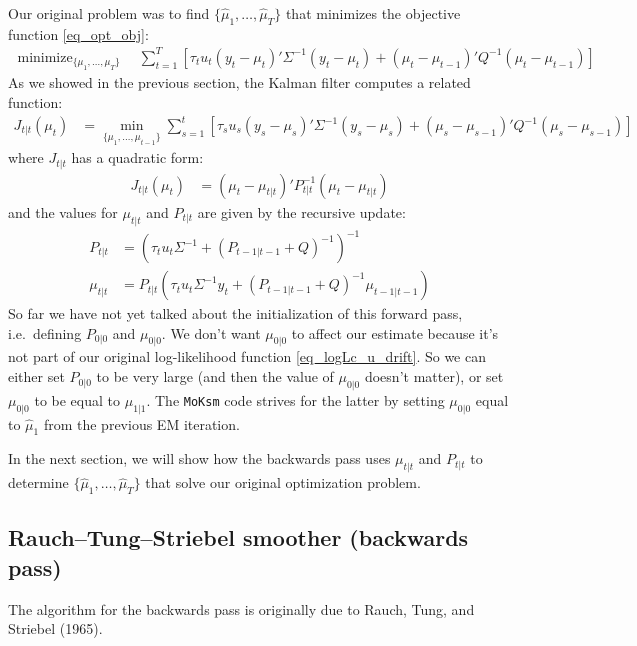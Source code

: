 \documentclass[11pt]{article}
\DeclareMathOperator*{\minimize}{minimize}
\begin{document}
Our original problem was to find $\{ \hat\mu_1, \dotsc, \hat\mu_T\}$ that minimizes the objective function \eqref{eq_opt_obj}:
\begin{align*}
	\minimize_{\{\mu_1, \dotsc, \mu_T\}} \quad 
	\sum_{t=1}^T \left[ \tau_{t} u_{t} (y_t - \mu_{t})' \Sigma^{-1} (y_t-\mu_{t}) 
	+ (\mu_{t} - \mu_{t-1})' Q^{-1} (\mu_{t} - \mu_{t-1}) \right]
\end{align*}
As we showed in the previous section, the Kalman filter computes a related function:
\begin{align*}
	J_{t|t}( \mu_t ) &= \min_{\{\mu_1, \dotsc, \mu_{t-1}\}} \sum_{s=1}^t \left[ 
	\tau_s u_s (y_s - \mu_s)' \Sigma^{-1} (y_s - \mu_s) + (\mu_s - \mu_{s-1})' Q^{-1} (\mu_s - \mu_{s-1})
	\right]
\end{align*}
where $J_{t|t}$ has a quadratic form:
\begin{align*}
	J_{t|t}(\mu_t) &= (\mu_t - \mu_{t|t})' P_{t|t}^{-1} (\mu_t - \mu_{t|t})
\end{align*}
and the values for $\mu_{t|t}$ and $P_{t|t}$ are given by the recursive update:
\begin{align}
	P_{t|t} &= \left(\tau_t u_t \Sigma^{-1} + (P_{t-1|t-1} + Q)^{-1}\right)^{-1} \\
	\mu_{t|t} &= P_{t|t} \left(\tau_t u_t \Sigma^{-1} y_t + (P_{t-1|t-1} + Q)^{-1}\mu_{t-1|t-1}\right)
\end{align}
So far we have not yet talked about the initialization of this forward pass, i.e.\ defining $P_{0|0}$ and $\mu_{0|0}$. We don't want $\mu_{0|0}$ to affect our estimate because it's not part of our original log-likelihood function \eqref{eq_logLc_u_drift}.
So we can either set $P_{0|0}$ to be very large (and then the value of $\mu_{0|0}$ doesn't matter), or set $\mu_{0|0}$ to be equal to $\mu_{1|1}$. The \lstinline{MoKsm} code strives for the latter by setting $\mu_{0|0}$ equal to $\hat\mu_1$ from the previous EM iteration.

In the next section, we will show how the backwards pass uses $\mu_{t|t}$ and $P_{t|t}$ to determine $\{\hat\mu_1, \dotsc, \hat\mu_T\}$ that solve our original optimization problem.

\subsection{Rauch--Tung--Striebel smoother (backwards pass)}

The algorithm for the backwards pass is originally due to Rauch, Tung, and Striebel (1965).
\end{document}
